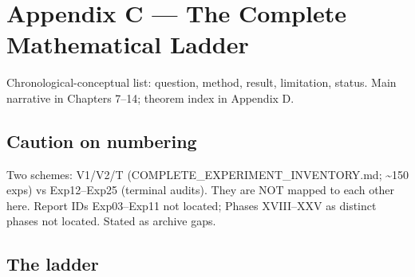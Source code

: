 \documentclass[
  11pt,
]{book}
\begin{document}
\newpage

\chapter{Appendix C --- The Complete Mathematical
Ladder}\label{appendix-c-the-complete-mathematical-ladder}

Chronological-conceptual list: question, method, result, limitation,
status. Main narrative in Chapters 7--14; theorem index in Appendix D.

\section{Caution on numbering}\label{caution-on-numbering}

Two schemes: V1/V2/T (COMPLETE\_EXPERIMENT\_INVENTORY.md;
\textasciitilde150 exps) vs Exp12--Exp25 (terminal audits). They are NOT
mapped to each other here. Report IDs Exp03--Exp11 not located; Phases
XVIII--XXV as distinct phases not located. Stated as archive gaps.

\section{The ladder}\label{the-ladder}
\end{document}
